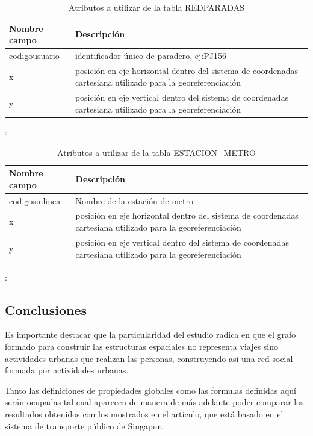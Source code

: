 \documentclass[12pt]{article}
\begin{document}
\begin{table}[h]
\begin{center}
  \begin{tabular}{| l | p{7cm} |}
    \hline
    Nombre campo & Descripción \\ \hline \hline
    codigousuario & identificador único de paradero, ej:PJ156 \\ \hline
    x & posición en eje horizontal dentro del sistema de coordenadas cartesiana utilizado para la georeferenciación \\ \hline
    y & posición en eje vertical dentro del sistema de coordenadas cartesiana utilizado para la georeferenciación \\ \hline
  \end{tabular}
\end{center}
\caption{Atributos a utilizar de la tabla REDPARADAS}:
\label{tabla:paradero}
\end{table}

\begin{table}[h]
\begin{center}
  \begin{tabular}{| l | p{7cm} |}
    \hline
    Nombre campo & Descripción \\ \hline \hline
    codigosinlinea & Nombre de la estación de metro \\ \hline
    x & posición en eje horizontal dentro del sistema de coordenadas cartesiana utilizado para la georeferenciación \\ \hline
    y & posición en eje vertical dentro del sistema de coordenadas cartesiana utilizado para la georeferenciación \\ \hline
  \end{tabular}
\end{center}
\caption{Atributos a utilizar de la tabla ESTACION\_METRO}:
\label{tabla:estacion_metro}
\end{table}

    \subsection{Conclusiones}
    
	Es importante destacar que la particularidad del estudio radica en que el grafo formado para construir las estructuras espaciales no representa viajes sino actividades urbanas que realizan las personas, construyendo así una red social formada por actividades urbanas.
	
	Tanto las definiciones de propiedades globales como las formulas definidas aquí serán ocupadas tal cual aparecen de manera de más adelante poder comparar los resultados obtenidos con los mostrados en el artículo, que está basado en el sistema de transporte público de Singapur.
\end{document}
